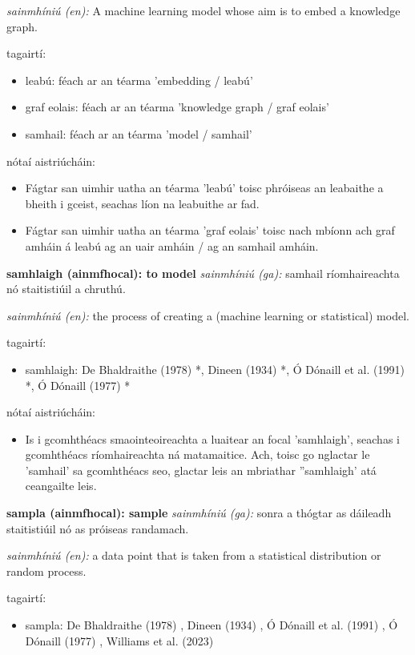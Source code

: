 \documentclass{article}
\begin{document}
\textit{sainmhíniú (en):} A machine learning model whose aim is to embed a knowledge graph.

tagairtí:
\begin{itemize}
	\item leabú: féach ar an téarma 'embedding / leabú'
	\item graf eolais: féach ar an téarma 'knowledge graph / graf eolais'
	\item samhail: féach ar an téarma 'model / samhail'
\end{itemize}

nótaí aistriúcháin:
\begin{itemize}
	\item Fágtar san uimhir uatha an téarma 'leabú' toisc phróiseas an leabaithe a bheith i gceist, seachas líon na leabuithe ar fad.
	\item Fágtar san uimhir uatha an téarma 'graf eolais' toisc nach mbíonn ach graf amháin á leabú ag an uair amháin / ag an samhail amháin.
\end{itemize}


\textbf{samhlaigh (ainmfhocal): to model}
\textit{sainmhíniú (ga):} samhail ríomhaireachta nó staitistiúil a chruthú.

\textit{sainmhíniú (en):} the process of creating a (machine learning or statistical) model.

tagairtí:
\begin{itemize}
	\item samhlaigh: De Bhaldraithe (1978) \cite{de-bhaldraithe}*, Dineen (1934) \cite{dineen}*, Ó Dónaill et al. (1991) \cite{focloir-beag}*, Ó Dónaill (1977) \cite{odonaill}*
\end{itemize}

nótaí aistriúcháin:
\begin{itemize}
	\item Is i gcomhthéacs smaointeoireachta a luaitear an focal 'samhlaigh', seachas i gcomhthéacs ríomhaireachta ná matamaitice. Ach, toisc go nglactar le 'samhail' sa gcomhthéacs seo, glactar leis an mbriathar ''samhlaigh' atá ceangailte leis.
\end{itemize}


\textbf{sampla (ainmfhocal): sample}
\textit{sainmhíniú (ga):} sonra a thógtar as dáileadh staitistiúil nó as próiseas randamach.

\textit{sainmhíniú (en):} a data point that is taken from a statistical distribution or random process.

tagairtí:
\begin{itemize}
	\item sampla: De Bhaldraithe (1978) \cite{de-bhaldraithe}, Dineen (1934) \cite{dineen}, Ó Dónaill et al. (1991) \cite{focloir-beag}, Ó Dónaill (1977) \cite{odonaill}, Williams et al. (2023) \cite{storchiste}
\end{itemize}
\end{document}
